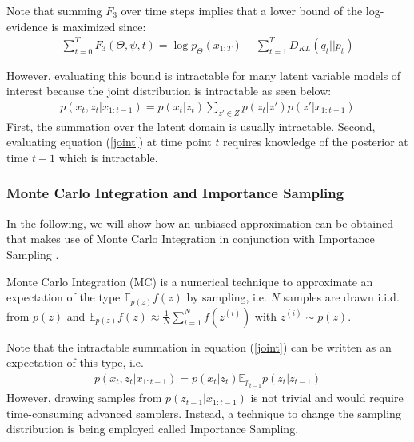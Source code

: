 Note that summing $F_3$ over time steps implies that a lower bound of the log-evidence is maximized since:
\begin{align*}
\sum_{t=0}^T F_3(\Theta, \psi, t) = \log p_\Theta(x_{1:T}) - \sum_{t=1}^T D_{KL}(q_t || p_t)
\end{align*}

However, evaluating this bound is intractable for many latent variable models of interest because the joint distribution is intractable as seen below:
\begin{align}
p(x_t,z_t|x_{1:t-1}) = p(x_t|z_t) \sum_{z' \in Z} p(z_t|z') p(z' | x_{1:t-1}) \label{joint}
\end{align}
First, the summation over the latent domain is usually intractable. Second, evaluating equation (\ref{joint}) at time point $t$ requires knowledge of the posterior at time $t-1$ which is intractable.

\subsubsection{Monte Carlo Integration and Importance Sampling}
\label{MC-IS}
In the following, we will show how an unbiased approximation can be obtained that makes use of Monte Carlo Integration in conjunction with Importance Sampling \cite{mcbook}.

Monte Carlo Integration (MC) is a numerical technique to approximate an expectation of the type $\mathbb E_{p(z)} f(z)$ by sampling, i.e. $N$ samples are drawn i.i.d. from $p(z)$ and $\mathbb E_{p(z)} f(z) \approx \frac{1}{N} \sum_{i=1}^N f(z^{(i)})$ with $z^{(i)} \sim p(z)$.

Note that the intractable summation in equation (\ref{joint}) can be written as an expectation of this type, i.e. 
\begin{align}
p(x_t,z_t|x_{1:t-1}) = p(x_t|z_t) \mathbb E_{p_{t-1}} p(z_t|z_{t-1})  \label{joint2}
\end{align}
However, drawing samples from $p(z_{t-1} | x_{1:t-1})$ is not trivial and would require time-consuming advanced samplers. Instead, a technique to change the sampling distribution is being employed called Importance Sampling.

